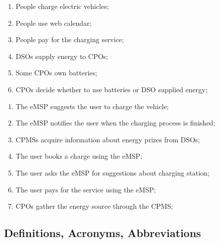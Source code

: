 \begin{enumerate}[label=W\arabic*]
    \item People charge electric vehicles; \label{world:people-charge-vehicles}
    \item People use web calendar; \label{world:people-use-calendars}
    \item People pay for the charging service; \label{world:people-pay-service}
    \item \acp{DSO} supply energy to \acp{CPO}; \label{world:DSO-supply-energy}
    \item Some \acp{CPO} own batteries; \label{world:CPO-own-batteries}
    \item \acp{CPO} decide whether to use batteries or \ac{DSO} supplied energy; \label{world:CPO-decide-energy}
\end{enumerate}
\begin{enumerate}[label=S\arabic*]
    \item The \ac{eMSP} suggests the user to charge the vehicle; \label{shared:eMSP-suggests-charge}
    \item The \ac{eMSP} notifies the user when the charging process is finished; \label{shared:eMSP-notifies-charging-finished}
    \item \acp{CPMS} acquire information about energy prizes from \acp{DSO}; \label{shared:CPMS-info-from-DSO}
    \item The user books a charge using the \ac{eMSP}; \label{shared:user-books-charge}
    \item The user asks the \ac{eMSP} for suggestions about charging station; \label{shared:user-asks-suggestions}
    \item The user pays for the service using the \ac{eMSP}; \label{shared:user-pays-service}
    \item \acp{CPO} gather the energy source through the \ac{CPMS}; \label{shared:CPO-energy-through-CPMS}
\end{enumerate}

\subsection{Definitions, Acronyms, Abbreviations}
\begin{multicols}{2}[]
    \begin{acronym}[RASD]
    \end{acronym}
\end{multicols}

